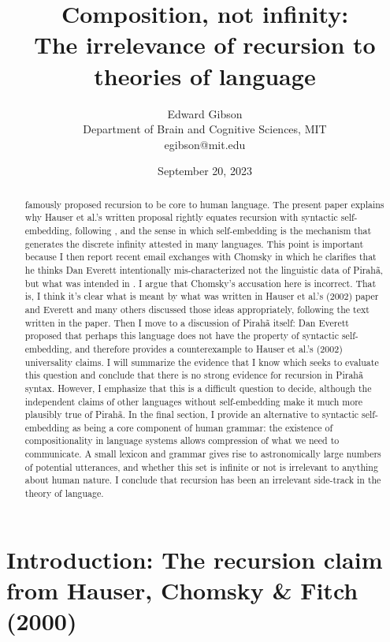 \documentclass{article}
\title{Composition, not infinity: \\The irrelevance of recursion to theories of language}
\author{Edward Gibson\\
Department of Brain and Cognitive Sciences, MIT\\
egibson@mit.edu}
\date{September 20, 2023}
\begin{document}
\maketitle

\begin{abstract}

\cite{hauser2002faculty} famously proposed recursion to be core to human language. The present paper explains why Hauser et al.'s written proposal rightly equates recursion with syntactic self-embedding, following \cite{pullum2020theorizing}, and the sense in which self-embedding is the mechanism that generates the discrete infinity attested in many languages. This point is important because I then report recent email exchanges with Chomsky in which he clarifies that he thinks Dan Everett intentionally mis-characterized not the linguistic data of Pirahã, but what was intended in \cite{hauser2002faculty}. I argue that Chomsky’s accusation here is incorrect. That is, I think it’s clear what is meant by what was written in Hauser et al.'s (2002) paper and Everett and many others discussed those ideas appropriately, following the text written in the paper.  Then I move to a discussion of Pirahã itself: Dan Everett proposed that perhaps this language does not have the property of syntactic self-embedding, and therefore provides a counterexample to Hauser et al.'s (2002) universality claims. I will summarize the evidence that I know which seeks to evaluate this question and conclude that there is no strong evidence for recursion in Pirahã syntax. However, I emphasize that this is a difficult question to decide, although the independent claims of other languages without self-embedding make it much more plausibly true of Pirahã. In the final section, I provide an alternative to syntactic self-embedding as being a core component of human grammar: the existence of compositionality in language systems allows compression of what we need to communicate. A small lexicon and grammar gives rise to astronomically large numbers of potential utterances, and whether this set is infinite or not is irrelevant to anything about human nature. I conclude that recursion has been an irrelevant side-track in the theory of language.

\end{abstract}

\section{Introduction: The recursion claim from Hauser, Chomsky \& Fitch (2000)}
\end{document}
